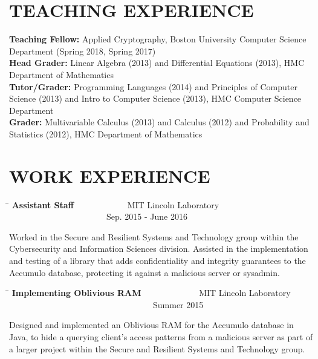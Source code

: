 \documentclass{res}
\begin{document}
\begin{resume}
\section{TEACHING EXPERIENCE}
\vspace{0.1in}
\textbf{Teaching Fellow:} Applied Cryptography, Boston University Computer Science Department (Spring 2018, Spring 2017) \\
\textbf{Head Grader:}  Linear Algebra (2013) and 
Differential Equations (2013), HMC Department of Mathematics \\
\textbf{Tutor/Grader:} Programming Languages (2014) and Principles of Computer Science (2013) and
Intro to Computer Science (2013), HMC Computer Science Department \\
\textbf{Grader:}  Multivariable Calculus (2013) and Calculus (2012) and Probability and Statistics
(2012), HMC Department of Mathematics \\



\section{WORK EXPERIENCE}
\vspace{0in}
    \begin{tabbing}
   \hspace{3in}\=  \hspace{1.63in}\= \kill %
    {\bf Assistant Staff} \>~~~~~~~~~~~~MIT Lincoln Laboratory \>~~~~~~~~~~~~~~~~~~~~~~~Sep. 2015 - June 2016\\                       
   \end{tabbing}\vspace{-30pt}      %
    Worked in the Secure and Resilient Systems and Technology group within the Cybersecurity and Information Sciences division.  Assisted in the implementation and testing of a library that adds confidentiality and integrity guarantees to the Accumulo database, protecting it against a malicious server or sysadmin.

   \begin{tabbing}
   \hspace{3in}\=  \hspace{1.63in}\= \kill %
    {\bf Implementing Oblivious RAM} \>~~~~~~~~~~~~~MIT Lincoln Laboratory \>~~~~~~~~~~~~~~~~~~~~~~~~~~~~~~~~~~Summer 2015\\                       
   \end{tabbing}\vspace{-30pt}      %
    Designed and implemented an Oblivious RAM for the Accumulo database in Java, to hide a querying client's access patterns from a malicious server as part of a larger project within the Secure and Resilient Systems and Technology group.


\end{resume}
\end{document}
